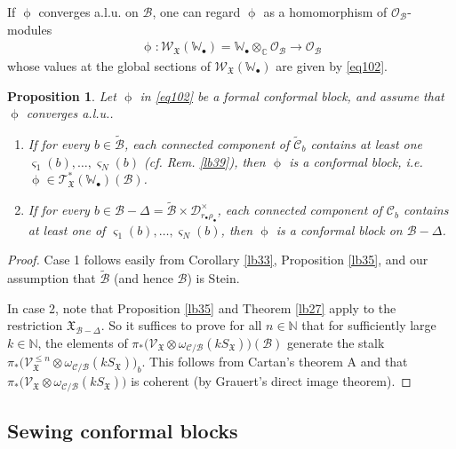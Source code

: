 \documentclass[12pt,b5paper,notitlepage]{report}
\theoremstyle{definition}
\theoremstyle{plain}
\newtheorem{pp}[df]{Proposition}
\newcommand{\fk}{\mathfrak}
\newcommand{\mc}{\mathcal}
\newcommand{\wtd}{\widetilde}
\newcommand{\scr}{\mathscr}
\newcommand{\sgm}{\varsigma}
\newcommand{\SX}{S_{\fk X}}
\newcommand{\blt}{\bullet}
\newcommand{\Wbb}{\mathbb W}
\newcommand{\Cbb}{\mathbb C}
\newcommand{\Nbb}{\mathbb N}
\numberwithin{equation}{section}
\begin{document}
If $\upphi$ converges a.l.u. on $\mc B$, one can regard $\upphi$ as a homomorphism of $\scr O_{\mc B}$-modules
\begin{align*}
\upphi:\scr W_{\fk X}(\Wbb_\blt)=\Wbb_\blt\otimes_\Cbb\scr O_{\mc B}\rightarrow\scr O_{\mc B}
\end{align*}
whose values at the global sections of $\scr W_{\fk X}(\Wbb_\blt)$  are given by \eqref{eq102}.

\begin{pp}\label{lb43}
Let $\upphi$ in \eqref{eq102} be a formal conformal block, and assume that $\upphi$ converges a.l.u..
\begin{enumerate}
\item If for every $b\in\wtd{\mc B}$, each connected component of  $\wtd{\mc C}_b$ contains at least one $\sgm_1(b),\dots,\sgm_N(b)$ (cf. Rem. \ref{lb39}), then  $\upphi$ is a conformal block, i.e. $\upphi\in\scr T_{\fk X}^*(\Wbb_\blt)(\mc B)$.
\item If  for every $b\in\mc B-\Delta=\wtd{\mc B}\times\mc D_{r_\blt\rho_\blt}^\times$, each connected component of $\mc C_b$ contains at least one of $\sgm_1(b),\dots,\sgm_N(b)$, then $\upphi$ is a conformal block on $\mc B-\Delta$.
\end{enumerate}

\end{pp}


\begin{proof}
Case 1 follows easily from Corollary \ref{lb33}, Proposition \ref{lb35}, and our assumption that $\wtd{\mc B}$ (and hence $\mc B$) is Stein.

In case 2, note that Proposition \ref{lb35} and Theorem \ref{lb27} apply to the restriction $\fk X_{\mc B-\Delta}$. So it suffices to prove for all $n\in\Nbb$ that for sufficiently large $k\in\Nbb$, the elements of $\pi_*\big(\scr V_{\fk X}\otimes\omega_{\mc C/\mc B}(k S_{\fk X})\big)(\mc B)$  generate the stalk $\pi_*\big(\scr V_{\fk X}^{\leq n}\otimes\omega_{\mc C/\mc B}(k\SX)\big)_b$. This follows from Cartan's theorem A and that $\pi_*\big(\scr V_{\fk X}\otimes\omega_{\mc C/\mc B}(k S_{\fk X})\big)$ is coherent (by Grauert's direct image theorem).
\end{proof}







\subsection*{Sewing conformal blocks}
\end{document}
